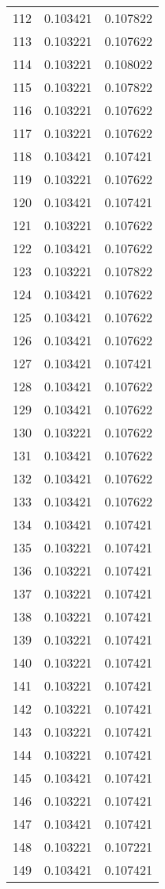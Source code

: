 \begin{longtable}{rrr}
112 & 0.103421 & 0.107822 \\
113 & 0.103221 & 0.107622 \\
114 & 0.103221 & 0.108022 \\
115 & 0.103221 & 0.107822 \\
116 & 0.103221 & 0.107622 \\
117 & 0.103221 & 0.107622 \\
118 & 0.103421 & 0.107421 \\
119 & 0.103221 & 0.107622 \\
120 & 0.103421 & 0.107421 \\
121 & 0.103221 & 0.107622 \\
122 & 0.103421 & 0.107622 \\
123 & 0.103221 & 0.107822 \\
124 & 0.103421 & 0.107622 \\
125 & 0.103421 & 0.107622 \\
126 & 0.103421 & 0.107622 \\
127 & 0.103421 & 0.107421 \\
128 & 0.103421 & 0.107622 \\
129 & 0.103421 & 0.107622 \\
130 & 0.103221 & 0.107622 \\
131 & 0.103421 & 0.107622 \\
132 & 0.103421 & 0.107622 \\
133 & 0.103421 & 0.107622 \\
134 & 0.103421 & 0.107421 \\
135 & 0.103221 & 0.107421 \\
136 & 0.103221 & 0.107421 \\
137 & 0.103221 & 0.107421 \\
138 & 0.103221 & 0.107421 \\
139 & 0.103221 & 0.107421 \\
140 & 0.103221 & 0.107421 \\
141 & 0.103221 & 0.107421 \\
142 & 0.103221 & 0.107421 \\
143 & 0.103221 & 0.107421 \\
144 & 0.103221 & 0.107421 \\
145 & 0.103421 & 0.107421 \\
146 & 0.103221 & 0.107421 \\
147 & 0.103421 & 0.107421 \\
148 & 0.103221 & 0.107221 \\
149 & 0.103421 & 0.107421 \\

\end{longtable}
